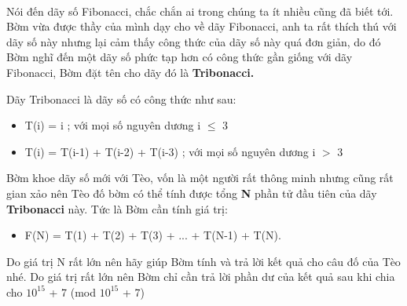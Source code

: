  

Nói đến dãy số Fibonacci, chắc chắn ai trong chúng ta ít nhiều cũng đã biết tới. Bờm vừa được thầy của mình dạy cho về dãy Fibonacci, anh ta rất thích thú với dãy số này nhưng lại cảm thấy công thức của dãy số này quá đơn giản, do đó Bờm nghĩ đến một dãy số phức tạp hơn có công thức gần giống với dãy Fibonacci, Bờm đặt tên cho dãy đó là \textbf{ Tribonacci. }

Dãy Tribonacci là dãy số có công thức như sau:
\begin{itemize}
	\item T(i) = i ; với mọi số nguyên dương i  $\le$  3
	\item T(i) = T(i-1) + T(i-2) + T(i-3) ; với mọi số nguyên dương i $>$ 3
\end{itemize}

Bờm khoe dãy số mới với Tèo, vốn là một người rất thông minh nhưng cũng rất gian xảo nên Tèo đố bờm có thể tính được tổng \textbf{ N } phần tử đầu tiên của dãy \textbf{ Tribonacci } này. Tức là Bờm cần tính giá trị:
\begin{itemize}
	\item F(N) = T(1) + T(2) + T(3) + ... + T(N-1) + T(N).
\end{itemize}

Do giá trị N rất lớn nên hãy giúp Bờm tính và trả lời kết quả cho câu đố của Tèo nhé. Do giá trị rất lớn nên Bờm chỉ cần trả lời phần dư của kết quả sau khi chia cho $10^{15}$ + 7 (mod $10^{15}$ + 7)